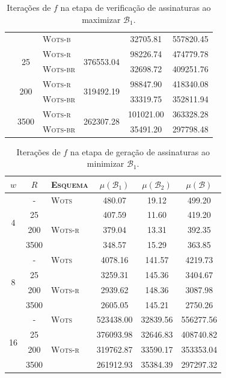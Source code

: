 \documentclass[12pt,notitlepage]{report}
\begin{document}
\begin{table}[htbp]
\begin{tabular}{cclccc}
     & &  \textsc{Wots-b} &   &   32705.81 &  557820.45 \\ \cline{2-6}
    & \multirow{2}{*}{25}
      &  \textsc{Wots-r} &  \multirow{2}{*}{376553.04} &   98226.74 &  474779.78 \\
     & & \textsc{Wots-br} &   &   32698.72 &  409251.76 \\ \cline{2-6}
    & \multirow{2}{*}{200}
      &  \textsc{Wots-r} &  \multirow{2}{*}{319492.19} &   98847.90 &  418340.08 \\
     & & \textsc{Wots-br} &   &   33319.75 &  352811.94 \\ \cline{2-6}
    & \multirow{2}{*}{3500}
      &  \textsc{Wots-r} &  \multirow{2}{*}{262307.28} &  101021.00 &  363328.28 \\
     & & \textsc{Wots-br} &  &   35491.20 &  297798.48 \\
    \bottomrule
    \end{tabular}
    \label{tab:2}
    \caption{Iterações de $f$ na etapa de verificação de assinaturas ao maximizar $\mathcal{B}_1$.}
\end{table}

\begin{table}[htbp]
    \setlength{\tabcolsep}{7pt}
    \centering
    \begin{tabular}{cclccc}
    \toprule
    $w$ & $R$ & \textsc{Esquema} & $\mu(\mathcal{B}_1)$ & $\mu(\mathcal{B}_2)$ & $\mu(\mathcal{B})$ \\
    \toprule
\multirow{4}{*}{4}
   & - &    \textsc{Wots} &     480.07 &      19.12 &     499.20 \\
  & 25 &  \multirow{3}{*}{\textsc{Wots-r}} &     407.59 &      11.60 &     419.20 \\
 & 200 &  &     379.04 &      13.31 &     392.35 \\
& 3500 &  &     348.57 &      15.29 &     363.85 \\ \hline
\multirow{4}{*}{8}
 & - &    \textsc{Wots} &    4078.16 &     141.57 &    4219.73 \\
& 25 &  \multirow{3}{*}{\textsc{Wots-r}} &    3259.31 &     145.36 &    3404.67 \\
& 200 &  &    2939.62 &     148.36 &    3087.98 \\
 & 3500 &  &    2605.05 &     145.21 &    2750.26 \\ \hline
\multirow{4}{*}{16}
& - &    \textsc{Wots} &  523438.00 &   32839.56 &  556277.56 \\
 & 25 &  \multirow{3}{*}{\textsc{Wots-r}} &  376093.98 &   32646.83 &  408740.82 \\
 & 200 &  &  319762.87 &   33590.17 &  353353.04 \\
 & 3500 &   &  261912.93 &   35384.39 &  297297.32 \\
    \bottomrule
    \end{tabular}
    \label{tab:3}
    \caption{Iterações de $f$ na etapa de geração de assinaturas ao minimizar $\mathcal{B}_1$.}
\end{table}
\end{document}
